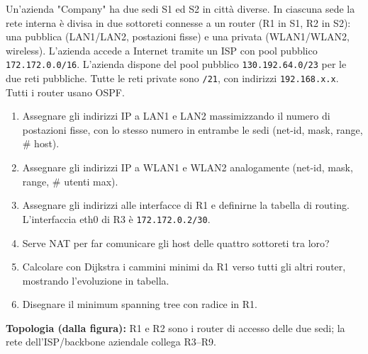 \documentclass[12pt, a4paper]{article}
\begin{document}
\begin{tcolorbox}[colback=lightergray!10, colframe=tocsec, title=\textbf{Esercizio: Configurazione di una Rete (Company)}]
Un'azienda "Company" ha due sedi S1 ed S2 in città diverse. In ciascuna sede la rete interna è divisa in due sottoreti connesse a un router (R1 in S1, R2 in S2): una pubblica (LAN1/LAN2, postazioni fisse) e una privata (WLAN1/WLAN2, wireless). L'azienda accede a Internet tramite un ISP con pool pubblico \texttt{172.172.0.0/16}. L'azienda dispone del pool pubblico \texttt{130.192.64.0/23} per le due reti pubbliche. Tutte le reti private sono \texttt{/21}, con indirizzi \texttt{192.168.x.x}. Tutti i router usano OSPF.

\begin{enumerate}
    \item Assegnare gli indirizzi IP a LAN1 e LAN2 massimizzando il numero di postazioni fisse, con lo stesso numero in entrambe le sedi (net-id, mask, range, \# host).
    \item Assegnare gli indirizzi IP a WLAN1 e WLAN2 analogamente (net-id, mask, range, \# utenti max).
    \item Assegnare gli indirizzi alle interfacce di R1 e definirne la tabella di routing. L'interfaccia eth0 di R3 è \texttt{172.172.0.2/30}.
    \item Serve NAT per far comunicare gli host delle quattro sottoreti tra loro?
    \item Calcolare con Dijkstra i cammini minimi da R1 verso tutti gli altri router, mostrando l'evoluzione in tabella.
    \item Disegnare il minimum spanning tree con radice in R1.
\end{enumerate}
\end{tcolorbox}

\textbf{Topologia (dalla figura):} R1 e R2 sono i router di accesso delle due sedi; la rete dell'ISP/backbone aziendale collega R3--R9.
\end{document}
